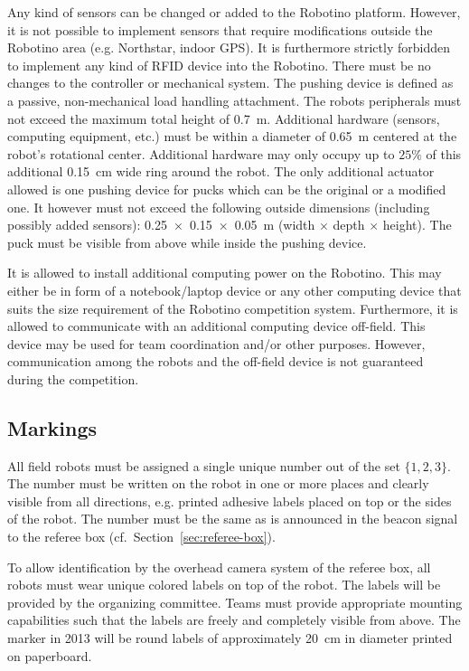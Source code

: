 \documentclass[12pt,twoside]{article}
\newcommand{\Robotino}{Robotino}
\newcommand{\refsec}[1]{Section~\ref{#1}}
\begin{document}
Any kind of sensors can be changed or added to the Robotino platform.
However, it is not possible to implement sensors that require
modifications outside the Robotino area (e.g. Northstar, indoor GPS).
It is furthermore strictly forbidden to implement any kind of RFID
device into the Robotino. There must be no changes to the controller
or mechanical system. The pushing device is defined as a passive,
non-mechanical load handling attachment. The robots peripherals must
not exceed the maximum total height of \SI{0.7}{\metre}. Additional
hardware (sensors, computing equipment, etc.) must be within a
diameter of \SI{0.65}{\metre} centered at the robot's rotational
center. Additional hardware may only occupy up to $25\%$ of this
additional \SI{0.15}{\centi\metre} wide ring around the robot.  The
only additional actuator allowed is one pushing device for pucks which
can be the original or a modified one. It however must not exceed the
following outside dimensions (including possibly added sensors):
\SI{0.25 x 0.15 x 0.05}{\metre} (width $\times$ depth $\times$
height). The puck must be visible from above while inside the pushing
device.

It is allowed to install additional computing power on the
\Robotino. This may either be in form of a notebook/laptop device or
any other computing device that suits the size requirement of the
\Robotino{} competition system. Furthermore, it is allowed to
communicate with an additional computing device off-field. This device
may be used for team coordination and/or other purposes. However,
communication among the robots and the off-field device is not
guaranteed during the competition.

\subsection{Markings}
\label{sec:robot-markings}
All field robots must be assigned a single unique number out of the
set $\{1, 2, 3\}$. The number must be written on the robot in one or
more places and clearly visible from all directions, e.g. printed
adhesive labels placed on top or the sides of the robot. The number
must be the same as is announced in the beacon signal to the referee
box (cf.~\refsec{sec:referee-box}).

To allow identification by the overhead camera system of the referee
box, all robots must wear unique colored labels on top of the
robot. The labels will be provided by the organizing committee. Teams
must provide appropriate mounting capabilities such that the labels
are freely and completely visible from above. The marker in 2013 will
be round labels of approximately \SI{20}{\centi\meter} in diameter
printed on paperboard.
\end{document}
